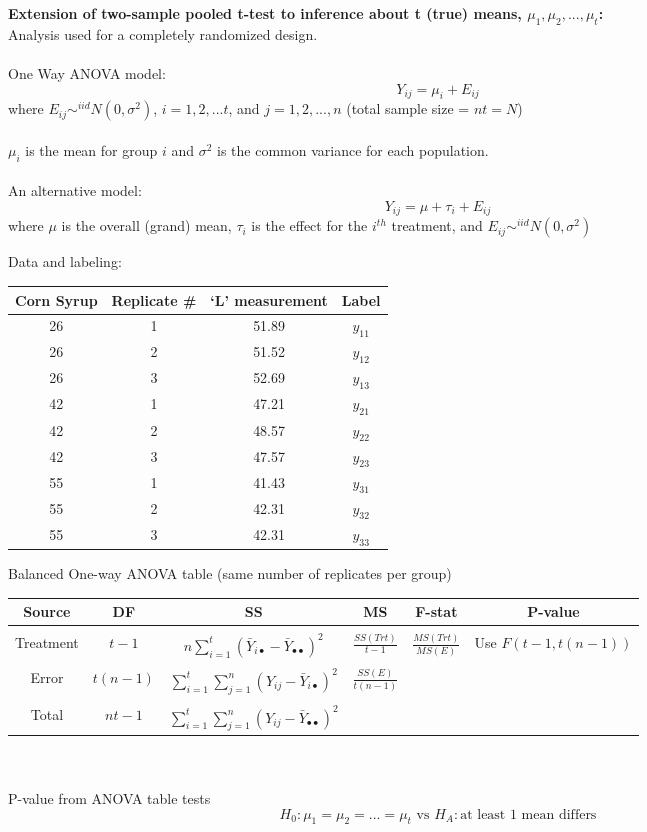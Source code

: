 \newpage

\noindent\Large \textbf{Extension of two-sample pooled t-test to inference about t (true) means, $\mu_1, \mu_2, ..., \mu_t$:}
\large\\
Analysis used for a completely randomized design.  \\~\\
One Way ANOVA model:\\
$$Y_{ij}=\mu_{i}+E_{ij}$$
where $E_{ij}\sim^{iid}N(0,\sigma^2)$, $i=1,2,...t$, and $j=1,2,...,n$ (total sample size = $nt=N$)\\~\\
$\mu_{i}$ is the mean for group $i$ and $\sigma^2$ is the common variance for each population.\\~\\
An alternative model:
$$Y_{ij}=\mu+\tau_{i}+E_{ij}$$
where $\mu$ is the overall (grand) mean, $\tau_i$ is the effect for the $i^{th}$ treatment, and $E_{ij}\sim^{iid}N(0,\sigma^2)$

Data and labeling:  
\normalsize
\begin{center}
\begin{tabular}{cc|cc}
Corn Syrup & Replicate \# & `L' measurement  & Label\\\hline
26 &1& 51.89&$y_{11}$\\
26 &2& 51.52&$y_{12}$\\
26 &3& 52.69&$y_{13}$\\
42 &1& 47.21&$y_{21}$\\
42 &2& 48.57&$y_{22}$\\
42 &3& 47.57&$y_{23}$\\
55 &1& 41.43&$y_{31}$\\
55& 2& 42.31&$y_{32}$\\
55& 3& 42.31&$y_{33}$\\
\end{tabular}
\end{center}

\large
Balanced One-way ANOVA table (same number of replicates per group)\\
\begin{center}
\begin{tabular}{c|c|c|c|c|c}
Source & DF & SS & MS & F-stat & P-value\\
\hline& & & & &\\
Treatment & $t-1$ & $n\sum_{i=1}^{t}(\bar{Y}_{i\bullet}-\bar{Y}_{\bullet\bullet})^2$ & $\frac{SS(Trt)}{t-1}$ & $\frac{MS(Trt)}{MS(E)}$ & Use $F(t-1,t(n-1))$\\& & & & &\\
Error & $t(n-1)$ & $\sum_{i=1}^{t}\sum_{j=1}^{n}(Y_{ij}-\bar{Y}_{i\bullet})^2$ & $\frac{SS(E)}{t(n-1)}$ &  & \\& & & & &\\
Total & $nt-1$ & $\sum_{i=1}^{t}\sum_{j=1}^{n}(Y_{ij}-\bar{Y}_{\bullet\bullet})^2$ & & & \\
\end{tabular}
\end{center}

~\\~\\
P-value from ANOVA table tests 
$$H_0: \mu_1=\mu_2=...=\mu_t\mbox{  vs  }H_A: \mbox{at least 1 mean differs}$$
